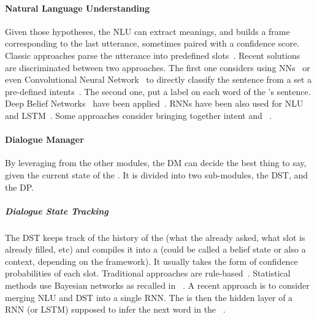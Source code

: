 \paragraph{Natural Language Understanding}

Given those hypotheses, the \gls{NLU} can extract meanings, and builds a  frame corresponding to the last  utterance, sometimes paired with a confidence score. Classic approaches parse the  utterance into predefined   slots~\parencite{chen2017-survey-sds}. Recent solutions are discriminated between two approaches. The first one considers using \glspl{NN}~\parencite{Deng2012-nn-for-nlu,Tr2012TowardsDU,Dauphin2014ZeroShotLA} or even Convolutional Neural Network~\parencite{Fukushima1980-cnn,Weng1993-cnn,LeCun1999-cnn} to directly classify the  sentence from a set a pre-defined intents~\parencite{Hashemi2016QueryID,Huang:2013:cnn-intent-detection-nlu,Shen:2014:cnn-intent-detection-nlu}. The second one,  put a label on each word of the 's sentence. Deep Belief Networks~\parencite{Deng2012-nn-for-nlu} have been applied~\parencite{Sarikaya2011-deepbeleifnetwork-smeantic-tagger,Deoras2014-deepbeleifnetwork-smeantic-tagger}. \glspl{RNN} have been also used for  \gls{NLU}~\parencite{mesnil2013-rnn-semantic-tagger,Yao2013-rnn-semantic-tagger-with-lm} and \gls{LSTM}~\parencite{Yao2014-lstm-semantic-tagger}. Some approaches consider bringing together  intent and ~\parencite{Zhang2016-joint-slot-filling-and-user-intent}.

\paragraph{Dialogue Manager}

By leveraging from the other modules, the \gls{DM} can decide the best thing to say, given the current state of the . It is divided into two sub-modules, the \acrfull{DST}, and the \acrfull{DP}.

\subparagraph{Dialogue State Tracking}

The \gls{DST} keeps track of the history of the  (what the  already asked, what slot is already filled, etc) and compiles it into a  (could be called a belief state or also a  context, depending on the framework). It usually takes the form of confidence probabilities of each slot. Traditional approaches are rule-based~\parencite{Goddeau1996-handcrafted-dst,sadek1997artimis}. Statistical methods use Bayesian networks as recalled in ~\parencite{Thomson:2013-thesis-dialogue-management,Henderson-dst-review}. A recent approach is to consider merging \gls{NLU} and \gls{DST} into a single \gls{RNN}. The  is then the hidden layer of a \gls{RNN} (or \gls{LSTM}) supposed to infer the next word in the ~\parencite{wen2017-rnn-hidden-state-for-mdp, barlier2018training}.

